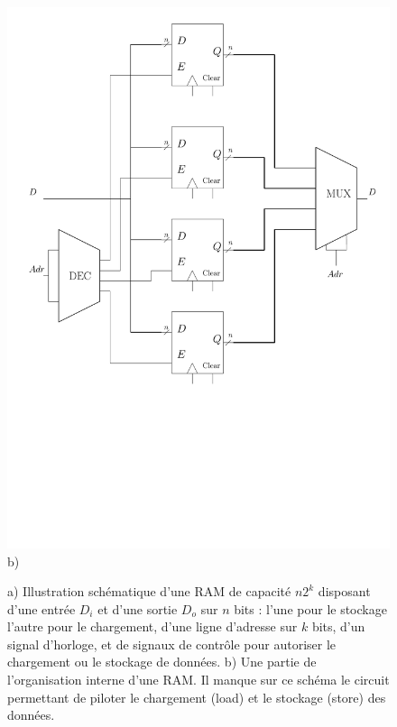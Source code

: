 \begin{figure}[htbp]
\begin{minipage}[c]{.4\linewidth}
\end{minipage}\hfill
\begin{minipage}[c]{.4\linewidth}
\includegraphics[width=\columnwidth]{Figs/ram_inner.pdf}
\\\centering b)
\end{minipage}
\caption{\label{fig:ram} a) Illustration schématique d'une RAM de capacité $n 2^k$ disposant d'une entrée $D_i$ et d'une sortie $D_o$ sur $n$ bits : l'une pour le stockage l'autre pour le chargement, d'une ligne d'adresse sur $k$ bits, d'un signal d'horloge, et de signaux de contrôle pour autoriser le chargement ou le stockage de données. b) Une partie de l'organisation interne d'une RAM. Il manque sur ce schéma le circuit permettant de piloter le chargement (load) et le stockage (store) des données. }
\end{figure}

